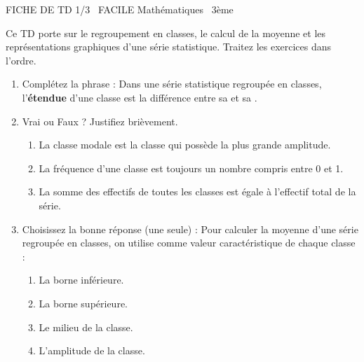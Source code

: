 \documentclass[11pt]{article}
\begin{document}
\begin{tcolorbox}[enhanced,colback=popink,colframe=popink,arc=10pt,boxrule=0pt,left=12pt,right=12pt,top=9pt,bottom=9pt]
{\color{white}\popxbold\small FICHE DE TD 1/3 \textbullet\ FACILE \hfill Mathématiques \textbullet\ 3ème\par}
\end{tcolorbox}
\vspace{4pt}
\noindent Ce TD porte sur le regroupement en classes, le calcul de la moyenne et les représentations graphiques d'une série statistique. Traitez les exercices dans l'ordre.

\begin{exercice}
\begin{enumerate}
    \item Complétez la phrase : Dans une série statistique regroupée en classes, l'\textbf{étendue} d'une classe est la différence entre sa \underline{\hspace{3cm}} et sa \underline{\hspace{3cm}}.
    \item Vrai ou Faux ? Justifiez brièvement.
    \begin{enumerate}
        \item La classe modale est la classe qui possède la plus grande amplitude.
        \item La fréquence d'une classe est toujours un nombre compris entre 0 et 1.
        \item La somme des effectifs de toutes les classes est égale à l'effectif total de la série.
    \end{enumerate}
    \item Choisissez la bonne réponse (une seule) : Pour calculer la moyenne d'une série regroupée en classes, on utilise comme valeur caractéristique de chaque classe :
    \begin{enumerate}
        \item La borne inférieure.
        \item La borne supérieure.
        \item Le milieu de la classe.
        \item L'amplitude de la classe.
    \end{enumerate}
\end{enumerate}
\end{exercice}
\end{document}
